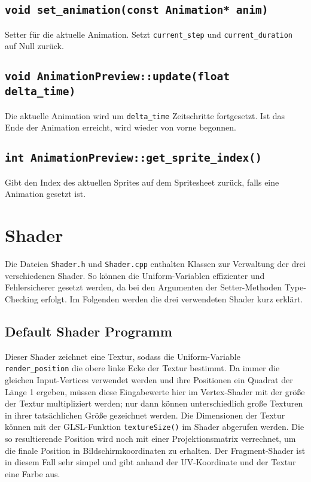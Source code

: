 \section{\lstinline{void set_animation(const Animation* anim)}}
Setter für die aktuelle Animation. Setzt \lstinline{current_step} und \lstinline{current_duration} auf Null zurück.

\section{\lstinline{void AnimationPreview::update(float delta_time)}}
Die aktuelle Animation wird um \lstinline{delta_time} Zeitschritte fortgesetzt. Ist das Ende der Animation erreicht, wird wieder von vorne begonnen. 

\section{\lstinline{int AnimationPreview::get_sprite_index()}}
Gibt den Index des aktuellen Sprites auf dem Spritesheet zurück, falls eine Animation gesetzt ist.

\chapter{Shader}
Die Dateien \lstinline{Shader.h} und \lstinline{Shader.cpp} enthalten Klassen zur Verwaltung der drei verschiedenen Shader. So können die Uniform-Variablen effizienter und Fehlersicherer gesetzt werden, da bei den Argumenten der Setter-Methoden Type-Checking erfolgt. Im Folgenden werden die drei verwendeten Shader kurz erklärt.

\section{Default Shader Programm}
Dieser Shader zeichnet eine Textur, sodass die Uniform-Variable \lstinline{render_position} die obere linke Ecke der Textur bestimmt. Da immer die gleichen Input-Vertices verwendet werden und ihre Positionen ein Quadrat der Länge 1 ergeben, müssen diese Eingabewerte hier im Vertex-Shader mit der größe der Textur multipliziert werden; nur dann können unterschiedlich große Texturen in ihrer tatsächlichen Größe gezeichnet werden. Die Dimensionen der Textur können mit der GLSL-Funktion \lstinline{textureSize()} im Shader abgerufen werden. Die so resultierende Position wird noch mit einer Projektionsmatrix verrechnet, um die finale Position in Bildschirmkoordinaten zu erhalten. Der Fragment-Shader ist in diesem Fall sehr simpel und gibt anhand der UV-Koordinate und der Textur eine Farbe aus.

